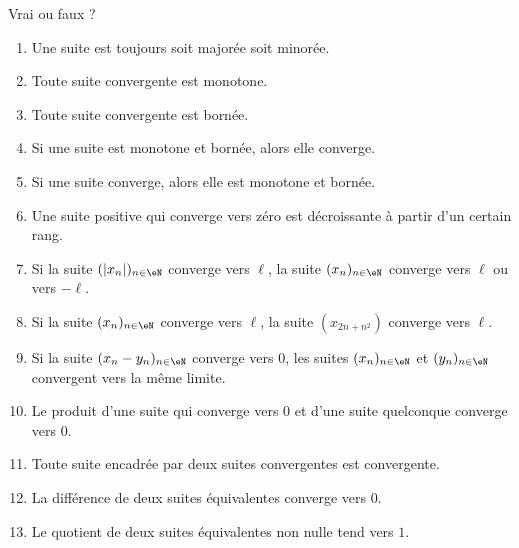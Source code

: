 


\begin{exercice}\label{exoTD3-0001}

	Vrai ou faux ?
	\begin{enumerate}
		\item
			Une suite est toujours soit majorée soit minorée.
		\item
			Toute suite convergente est monotone.
		\item
			Toute suite convergente est bornée.
		\item
			Si une suite est monotone et bornée, alors elle converge.
		\item
			Si une suite converge, alors elle est monotone et bornée.
		\item
			Une suite positive qui converge vers zéro est décroissante à partir d'un certain rang.
		\item
			Si la suite $(| x_n |)_{n\in\eN}$ converge vers $\ell$, la suite $(x_n)_{n\in\eN}$ converge vers $\ell$ ou vers $-\ell$.
		\item
			Si la suite $(x_n)_{n\in\eN}$ converge vers $\ell$, la suite $(x_{2n+n^2})$ converge vers $\ell$.
		\item
			Si la suite $(x_n-y_n)_{n\in\eN}$ converge vers $0$, les suites $(x_n)_{n\in\eN}$ et $(y_n)_{n\in\eN}$ convergent vers la même limite.
		\item
			Le produit d'une suite qui converge vers $0$ et d'une suite quelconque converge vers $0$.
		\item
			Toute suite encadrée par deux suites convergentes est convergente.
		\item
			La différence de deux suites équivalentes converge vers $0$.
		\item
			Le quotient de deux suites équivalentes non nulle tend vers $1$.
	\end{enumerate}

\end{exercice}
